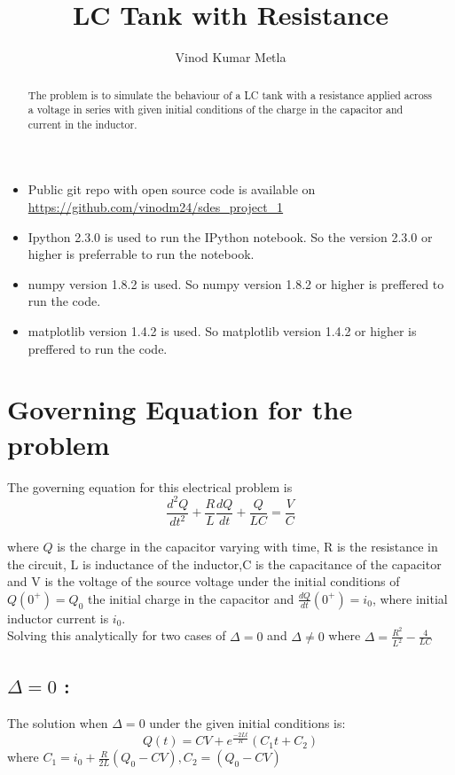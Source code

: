 \documentclass[12pt, a4paper]{report}
\title{\textbf{LC Tank with Resistance}}
\author{Vinod Kumar Metla}
\affil{Roll No. : 130010048}
\begin{document}
\maketitle
\newpage

\begin{abstract}
 The problem is to simulate the behaviour of a LC tank with a resistance applied across a voltage in series with given initial conditions of the charge in the capacitor and current in the inductor.
\end{abstract}

\begin{itemize}
\item Public git repo with open source code is available on \url{https://github.com/vinodm24/sdes_project_1}
\item Ipython 2.3.0 is used to run the IPython notebook. So the version 2.3.0 or higher is preferrable to run the notebook.
\item numpy version 1.8.2 is used. So numpy version 1.8.2 or higher is preffered to run the code.
\item matplotlib version 1.4.2 is used. So matplotlib version 1.4.2 or higher is preffered to run the code. 
\end{itemize}

\section*{Governing Equation for the problem}
The governing equation for this electrical problem is 
\begin{equation}
 \frac{d^2Q}{dt^2} + \frac{R}{L}\frac{dQ}{dt} + \frac{Q}{LC} = \frac{V}{C}
\end{equation}

where $Q$ is the charge in the capacitor varying with time, R is the resistance in the circuit, L is inductance of the inductor,C is the capacitance of the capacitor and V is the voltage of the source voltage under the initial conditions of $Q(0^+) = Q_0$ the initial charge in the capacitor and $\frac{dQ}{dt}(0^+) = i_0$, where initial inductor current is $i_0$. \\

Solving this analytically for two cases of $\Delta = 0$ and $\Delta \ne 0$ where $\Delta = \frac{R^2}{L^2} - \frac{4}{LC}$ \\
\subsection*{$\Delta = 0$ :}
The solution when $\Delta = 0$ under the given initial conditions is:
\begin{equation}
 Q(t) = CV + e^\frac{-2Lt}{R}(C_1t + C_2)
\end{equation}
where $C_1 = i_0+\frac{R}{2L}(Q_0-CV) , C_2 = (Q_0 - CV)$
\end{document}
